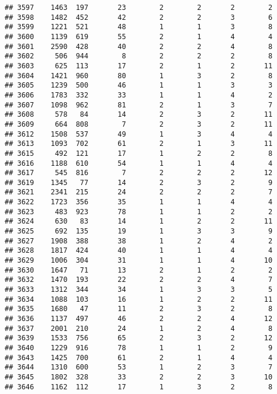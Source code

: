 \documentclass[]{article}
\begin{document}
\begin{verbatim}
## 3597    1463  197       23        2        2       2        2
## 3598    1482  452       42        2        2       3        6
## 3599    1221  521       48        1        1       3        8
## 3600    1139  619       55        2        1       4        4
## 3601    2590  428       40        2        2       4        8
## 3602     506  944        8        2        2       2        8
## 3603     625  113       17        2        1       2       11
## 3604    1421  960       80        1        3       2        8
## 3605    1239  500       46        1        1       3        3
## 3606    1783  332       33        1        1       4        2
## 3607    1098  962       81        2        1       3        7
## 3608     578   84       14        2        3       2       11
## 3609     664  808        7        2        3       2       11
## 3612    1508  537       49        1        3       4        4
## 3613    1093  702       61        2        1       3       11
## 3615     492  121       17        1        2       2        8
## 3616    1188  610       54        1        1       4        4
## 3617     545  816        7        2        2       2       12
## 3619    1345   77       14        2        3       2        9
## 3621    2341  215       24        2        2       2        7
## 3622    1723  356       35        1        1       4        4
## 3623     483  923       78        1        1       2        2
## 3624     630   83       14        1        2       2       11
## 3625     692  135       19        1        3       3        9
## 3627    1908  388       38        1        2       4        2
## 3628    1817  424       40        1        1       4        4
## 3629    1006  304       31        1        1       4       10
## 3630    1647   71       13        2        1       2        2
## 3632    1470  193       22        2        2       4        7
## 3633    1312  344       34        1        3       3        5
## 3634    1088  103       16        1        2       2       11
## 3635    1680   47       11        2        3       2        8
## 3636    1137  497       46        2        2       4       12
## 3637    2001  210       24        1        2       4        8
## 3639    1533  756       65        2        3       2       12
## 3640    1229  916       78        1        1       2        9
## 3643    1425  700       61        2        1       4        4
## 3644    1310  600       53        1        2       3        7
## 3645    1802  328       33        2        2       3       10
## 3646    1162  112       17        1        3       2        8

\end{verbatim}
\end{document}
